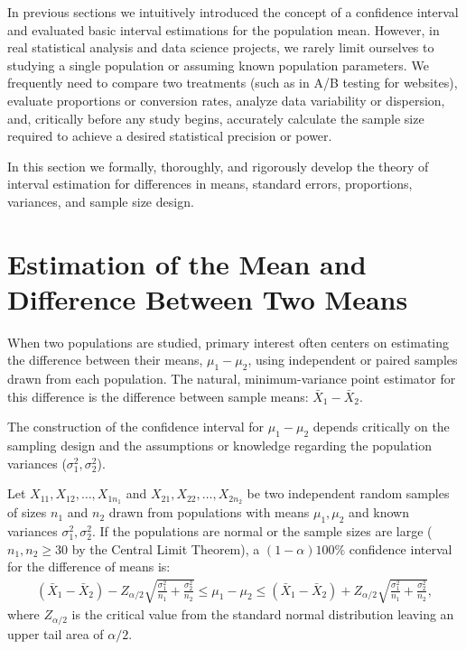In previous sections we intuitively introduced the concept of a confidence interval and evaluated basic interval estimations for the population mean. However, in real statistical analysis and data science projects, we rarely limit ourselves to studying a single population or assuming known population parameters. We frequently need to compare two treatments (such as in A/B testing for websites), evaluate proportions or conversion rates, analyze data variability or dispersion, and, critically before any study begins, accurately calculate the sample size required to achieve a desired statistical precision or power.

In this section we formally, thoroughly, and rigorously develop the theory of interval estimation for differences in means, standard errors, proportions, variances, and sample size design.

\section{Estimation of the Mean and Difference Between Two Means}

When two populations are studied, primary interest often centers on estimating the difference between their means, $\mu_1 - \mu_2$, using independent or paired samples drawn from each population. The natural, minimum-variance point estimator for this difference is the difference between sample means: $\bar{X}_1 - \bar{X}_2$.

The construction of the confidence interval for $\mu_1 - \mu_2$ depends critically on the sampling design and the assumptions or knowledge regarding the population variances ($\sigma_1^2, \sigma_2^2$).

\begin{teorema}
	Let $X_{11}, X_{12}, \ldots, X_{1n_1}$ and $X_{21}, X_{22}, \ldots, X_{2n_2}$ be two independent random samples of sizes $n_1$ and $n_2$ drawn from populations with means $\mu_1, \mu_2$ and known variances $\sigma_1^2, \sigma_2^2$. If the populations are normal or the sample sizes are large ($n_1, n_2 \geq 30$ by the Central Limit Theorem), a $(1-\alpha)100\%$ confidence interval for the difference of means is:
	\begin{align}
		(\bar{X}_1 - \bar{X}_2) - Z_{\alpha/2} \sqrt{\frac{\sigma_1^2}{n_1} + \frac{\sigma_2^2}{n_2}} \leq \mu_1 - \mu_2 \leq (\bar{X}_1 - \bar{X}_2) + Z_{\alpha/2} \sqrt{\frac{\sigma_1^2}{n_1} + \frac{\sigma_2^2}{n_2}},
	\end{align}
	where $Z_{\alpha/2}$ is the critical value from the standard normal distribution leaving an upper tail area of $\alpha/2$.
\end{teorema}


